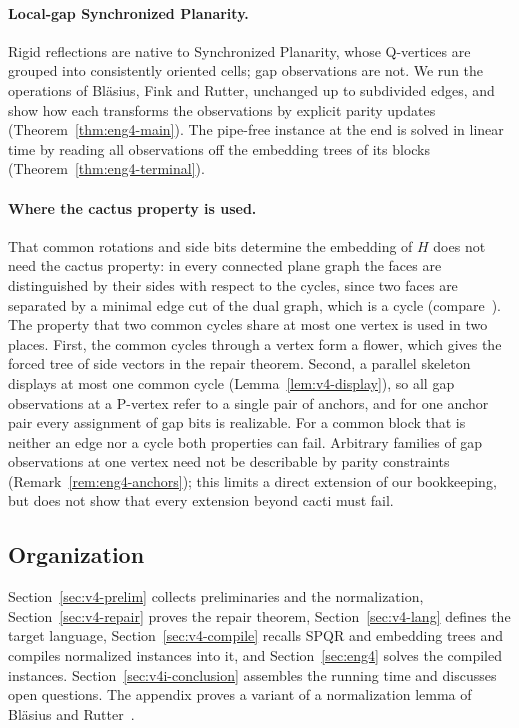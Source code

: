 \paragraph{Local-gap Synchronized Planarity.}
Rigid reflections are native to Synchronized Planarity, whose Q-vertices
are grouped into consistently oriented cells; gap observations are not. We
run the operations of Bl\"asius, Fink and Rutter, unchanged up to
subdivided edges, and show how each
transforms the observations by explicit parity updates
(Theorem~\ref{thm:eng4-main}). The pipe-free instance at the end is solved
in linear time by reading all observations off the embedding trees of its
blocks (Theorem~\ref{thm:eng4-terminal}).

\paragraph{Where the cactus property is used.}
That common rotations and side bits determine the embedding of $H$ does not
need the cactus property: in every connected plane graph the faces are
distinguished by their sides with respect to the cycles, since two faces are
separated by a minimal edge cut of the dual graph, which is a cycle
(compare~\cite[Theorem~8]{BKR18}). The property that
two common cycles share at most one vertex is used in two places. First,
the common cycles through a vertex form a flower, which gives the forced
tree of side vectors in the repair theorem. Second, a parallel skeleton
displays at most one common cycle (Lemma~\ref{lem:v4-display}), so all gap
observations at a P-vertex refer to a single pair of anchors, and for one
anchor pair every assignment of gap bits is realizable. For a common block
that is neither an edge nor a cycle both properties can fail. Arbitrary
families of gap observations at one vertex need not be describable by
parity constraints (Remark~\ref{rem:eng4-anchors}); this limits a direct
extension of our bookkeeping, but does not show that every extension beyond
cacti must fail.

\subsection{Organization}
Section~\ref{sec:v4-prelim} collects preliminaries and the normalization,
Section~\ref{sec:v4-repair} proves the repair theorem,
Section~\ref{sec:v4-lang} defines the target language,
Section~\ref{sec:v4-compile} recalls SPQR and embedding trees and compiles
normalized instances into it, and
Section~\ref{sec:eng4} solves the compiled instances.
Section~\ref{sec:v4i-conclusion} assembles the running time and discusses
open questions. The appendix proves a variant of a normalization lemma
of Bl\"asius and Rutter~\cite{BR15}.
